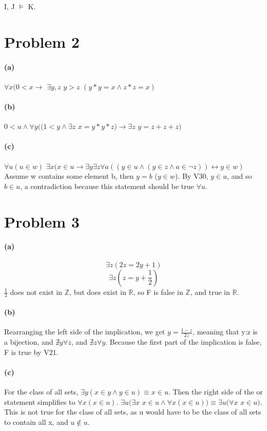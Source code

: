 \documentclass[10pt,letter]{article}
\begin{document}
I, J $\models$ K.

\section*{Problem 2}
\paragraph{(a)}
$\forall x(0 < x\rightarrow$ $\exists y,z$ $y>z$ $(y * y = x \wedge z * z = x)$

\paragraph{(b)}
$0 < u \wedge \forall y((1 < y \wedge \exists z$ $x = y * y * z) \rightarrow \exists z$ $y = z + z + z)$

\paragraph{(c)}
$\forall u(u \in w)$ $\exists x(x\in u \rightarrow \exists y\exists z\forall a((y \in u \wedge (y \in z \wedge a \in \neg z))\leftrightarrow y \in w)$\\
Assume w contains some element b, then $y = b$ ($y \in w$). By V30, $y \in u$, and so $b \in u$, a contradiction because this statement should be true $\forall u$. 


\section*{Problem 3}

\paragraph{(a)} $$\exists z(2z = 2y + 1)$$
$$\exists z(z = y + \frac{1}{2})$$
$\frac{1}{2}$ does not exist in $\mathbb{Z}$, but does exist in $\mathbb{R}$, so F is false in $\mathbb{Z}$, and true in $\mathbb{R}$.
\paragraph{(b)} Rearranging the left side of the implication, we get $y = \frac{1-z}{2z}$, meaning that y:z is a bijection, and $\nexists y \forall z$, and $\nexists z \forall y$. Because the first part of the implication is false, F is true by V21.
\paragraph{(c)} For the class of all sets, $\exists y (x\in y \wedge y\in u) \equiv x \in u$. Then the right side of the or statement simplifies to $\forall x (x \in u)$. $\exists u (\exists x$ $x \in u \wedge\forall x (x \in u)) \equiv \exists u(\forall x$ $x\in u)$. This is not true for the class of all sets, as u would have to be the class of all sets to contain all x, and $u \notin u$. 
\end{document}
